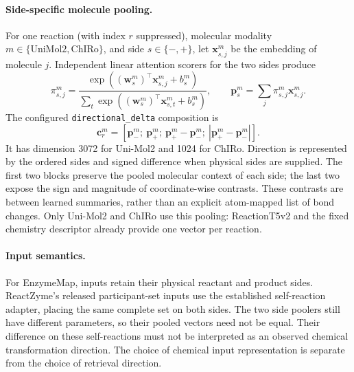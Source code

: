 \paragraph{Side-specific molecule pooling.}
For one reaction (with index $r$ suppressed), molecular modality
$m\in\{\mathrm{UniMol2},\mathrm{ChIRo}\}$, and side
$s\in\{-,+\}$, let $\mathbf{x}_{s,j}^{m}$ be the embedding of molecule $j$.
Independent linear attention scorers for the two sides produce
\begin{equation}
  \pi_{s,j}^{m}=
    \frac{\exp((\mathbf{w}_s^m)^\top \mathbf{x}_{s,j}^{m}+b_s^m)}
         {\sum_t\exp((\mathbf{w}_s^m)^\top \mathbf{x}_{s,t}^{m}+b_s^m)},
  \qquad
  \mathbf{p}_s^m=\sum_j\pi_{s,j}^{m}\mathbf{x}_{s,j}^{m}.
  \label{eq:v4-molecule-pool}
\end{equation}
The configured \texttt{directional\_delta} composition is
\begin{equation}
  \mathbf{c}_r^m=[\mathbf{p}_-^m;\ \mathbf{p}_+^m;\ \mathbf{p}_+^m-\mathbf{p}_-^m;\ |\mathbf{p}_+^m-\mathbf{p}_-^m|].
  \label{eq:v4-directional}
\end{equation}
It has dimension 3072 for Uni-Mol2 and 1024 for ChIRo. Direction is represented
by the ordered sides and signed difference when physical sides are supplied.
The first two blocks preserve the pooled molecular context of each side;
the last two expose the sign and magnitude of coordinate-wise contrasts.
These contrasts are between learned summaries, rather than an explicit
atom-mapped list of bond changes. Only Uni-Mol2 and ChIRo use this pooling:
ReactionT5v2 and the fixed chemistry descriptor already provide one vector
per reaction.

\paragraph{Input semantics.}
For EnzymeMap, inputs retain their physical reactant and product sides.
ReactZyme's released participant-set inputs use the established self-reaction
adapter, placing the same complete set on both sides. The two side poolers
still have different parameters, so their pooled vectors need not be equal.
Their difference on these self-reactions must not be interpreted as an
observed chemical transformation direction. The choice of chemical input
representation is separate from the choice of retrieval direction.

